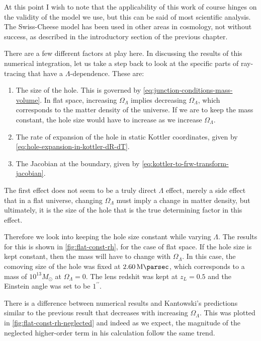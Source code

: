 At this point I wish to note that the applicability of this work of course hinges on the validity of the model we use, but this can be said of most scientific analysis. The Swiss-Cheese model has been used in other areas in cosmology, not without success, as described in the introductory section of the previous chapter.  

There are a few different factors at play here. In discussing the results of this numerical integration, let us take a step back to look at the specific parts of ray-tracing that have a $\Lambda$-dependence. These are:
\begin{enumerate}
  \item The size of the hole. This is governed by \autoref{eq:junction-conditions-mass-volume}. In flat space, increasing $\Omega_{\Lambda}$ implies decreasing $\Omega_{\Lambda}$, which corresponds to the matter density of the universe. If we are to keep the mass constant, the hole size would have to increase as we increase $\Omega_{\Lambda}$. 
  \item The rate of expansion of the hole in static Kottler coordinates, given by \autoref{eq:hole-expansion-in-kottler-dR-dT}.  
  \item The Jacobian at the boundary, given by \autoref{eq:kottler-to-frw-transform-jacobian}.
\end{enumerate}

The first effect does not seem to be a truly direct $\Lambda$ effect, merely a side effect that in a flat universe, changing $\Omega_{\Lambda}$ must imply a change in matter density, but ultimately, it is the size of the hole that is the true determining factor in this effect. 

Therefore we look into keeping the hole size constant while varying $\Lambda$. The results for this is shown in \autoref{fig:flat-const-rh}, for the case of flat space. If the hole size is kept constant, then the mass will have to change with $\Omega_{\Lambda}$. In this case, the comoving size of the hole was fixed at $\SI{2.60}{\mega\parsec}$, which corresponds to a mass of $10^{13}M_{\odot}$ at $\Omega_{\Lambda} = 0$. The lens redshit was kept at $z_L = 0.5$ and the Einstein angle was set to be $1^{\prime\prime}$.

There is a difference between numerical results and Kantowski's predictions similar to the previous result that decreases with increasing $\Omega_{\Lambda}$. This was plotted in \autoref{fig:flat-const-rh-neglected} and indeed as we expect, the magnitude of the neglected higher-order term in his calculation follow the same trend.

